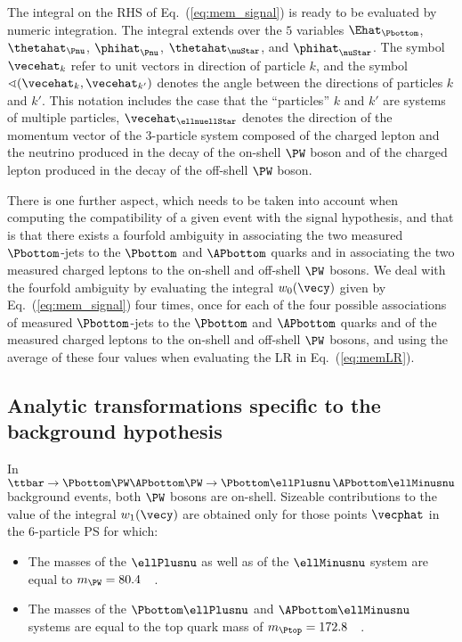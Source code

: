 The integral on the RHS of Eq.~(\ref{eq:mem_signal}) is ready to be evaluated by numeric integration. 
The integral extends over the $5$ variables
 $\Ehat_{\Pbottom}$, $\thetahat_{\Pnu}$, $\phihat_{\Pnu}$, $\thetahat_{\nuStar}$, and $\phihat_{\nuStar}$.
The symbol $\vecehat_{k}$ refer to unit vectors in direction of particle $k$,
and the symbol $\sphericalangle(\vecehat_{k},\vecehat_{k'})$ denotes the angle between the directions of particles $k$ and $k'$.
This notation includes the case that the ``particles'' $k$ and $k'$ are systems of multiple particles,
\eg $\vecehat_{\ellnuellStar}$ denotes the direction of the momentum vector of the $3$-particle system composed of
the charged lepton and the neutrino produced in the decay of the on-shell $\PW$ boson and of the charged lepton produced in the decay of the off-shell $\PW$ boson.

There is one further aspect, which needs to be taken into account when computing the compatibility of a given event with the signal hypothesis,
and that is that there exists a fourfold ambiguity in associating the two measured $\Pbottom$-jets to the $\Pbottom$ and $\APbottom$ quarks 
and in associating the two measured charged leptons to the on-shell and off-shell $\PW$ bosons.
We deal with the fourfold ambiguity by evaluating the integral $w_{0}(\vecy)$ given by Eq.~(\ref{eq:mem_signal}) four times,
once for each of the four possible associations of measured $\Pbottom$-jets to the $\Pbottom$ and $\APbottom$ quarks and of the measured charged leptons to the on-shell and off-shell $\PW$ bosons,
and using the average of these four values when evaluating the LR in Eq.~(\ref{eq:memLR}).


\subsection{Analytic transformations specific to the background hypothesis}
\label{sec:mem_background}

In $\ttbar \to \Pbottom\PW\APbottom\PW \to \Pbottom\ellPlusnu \, \APbottom\ellMinusnu$ background events,
both $\PW$ bosons are on-shell. Sizeable contributions to the value of the integral $w_{1}(\vecy)$ are obtained only
for those points $\vecphat$ in the $6$-particle PS for which:
\begin{itemize}
\item The masses of the $\ellPlusnu$ as well as of the $\ellMinusnu$ system are equal to $m_{\PW} = 80.4$~\GeV~\cite{PDG}.
\item The masses of the $\Pbottom\ellPlusnu$ and $\APbottom\ellMinusnu$ systems are equal to the top quark mass of $m_{\Ptop} = 172.8$~\GeV~\cite{PDG}.
\end{itemize}

